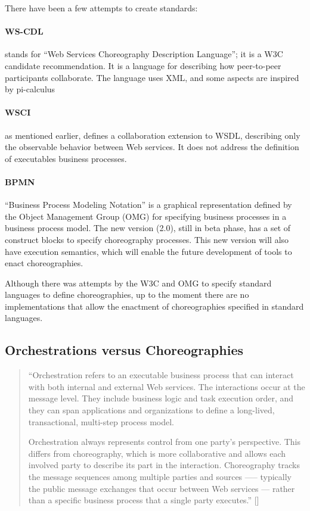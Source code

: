 There have been a few attempts to create standards:

\paragraph{WS-CDL}
stands for ``Web Services Choreography Description Language''; it is a W3C candidate recommendation. It is a language for describing how peer-to-peer participants collaborate. The language uses XML, and some aspects are inspired by pi-calculus

\paragraph{WSCI}
as mentioned earlier, defines a collaboration extension to WSDL, describing only the observable behavior between Web services. It does not address the definition of executables business processes.

\paragraph{BPMN}
``Business Process Modeling Notation'' is a graphical representation defined by the Object Management Group (OMG) for specifying business processes in a business process model. The new version (2.0), still in beta phase, has a set of construct blocks to specify choreography processes. This new version will also have execution semantics, which will enable the future development of tools to enact choreographies.

Although there was attempts by the W3C and OMG to specify standard languages to define choreographies, up to the moment there are no implementations that allow the enactment of choreographies specified in standard languages.

\subsection{Orchestrations versus Choreographies}

\begin{quotation}
	``Orchestration refers to an executable business process that can interact with both internal and external Web services. The interactions occur at the message level. They include business logic and task execution order, and they can span applications and organizations to define a long-lived, transactional, multi-step process model.

	Orchestration always represents control from one party’s perspective. This differs from choreography, which is more collaborative and allows each involved party to describe its part in the interaction. Choreography tracks the message sequences among multiple parties and sources —-- typically the public message exchanges that occur between Web services --- rather than a specific business process that a single party executes.'' [\citet{WSOC}]
\end{quotation}

